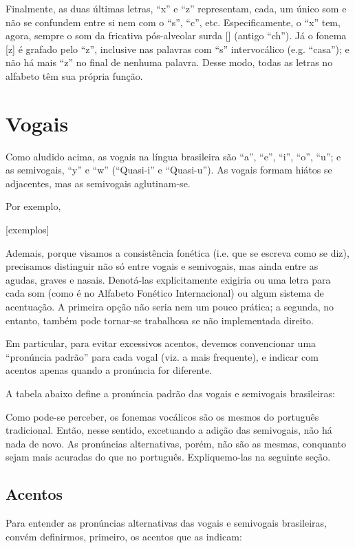 \documentclass[12pt, a5paper, titlepage]{article}
\begin{document}
\begin{bilingualpages}
    Finalmente, as duas últimas letras, ``x'' e ``z'' representam, cada, um único som e não se confundem entre si nem com o ``s'', ``c'', etc. Especificamente, o ``x'' tem, agora, sempre o som da fricativa pós-alveolar surda [\textesh] (antigo ``ch''). Já o fonema [z] é grafado pelo ``z'', inclusive nas palavras com ``s'' intervocálico (e.g. ``casa''); e não há mais ``z'' no final de nenhuma palavra. Desse modo, todas as letras no alfabeto têm sua própria função.

    \section{Vogais}
    Como aludido acima, as vogais na língua brasileira são ``a'', ``e'', ``i'', ``o'', ``u''; e as semivogais, ``y'' e ``w'' (``Quasi-i'' e ``Quasi-u''). As vogais formam hiátos se adjacentes, mas as semivogais aglutinam-se.
    
    Por exemplo,

    [exemplos]

    Ademais, porque visamos a consistência fonética (i.e. que se escreva como se diz), precisamos distinguir não só entre vogais e semivogais, mas ainda entre as agudas, graves e nasais. Denotá-las explicitamente exigiria ou uma letra para cada som (como é no Alfabeto Fonético Internacional) ou algum sistema de acentuação. A primeira opção não seria nem um pouco prática; a segunda, no entanto, também pode tornar-se trabalhosa se não implementada direito.
    
    Em particular, para evitar excessivos acentos, devemos convencionar uma ``pronúncia padrão'' para cada vogal (viz. a mais frequente), e indicar com acentos apenas quando a pronúncia for diferente.

    A tabela abaixo define a pronúncia padrão das vogais e semivogais brasileiras:

    \PtTableVowels

    Como pode-se perceber, os fonemas vocálicos são os mesmos do português tradicional. Então, nesse sentido, excetuando a adição das semivogais, não há nada de novo. As pronúncias alternativas, porém, não são as mesmas, conquanto sejam mais acuradas do que no português. Expliquemo-las na seguinte seção.

    \subsection{Acentos}
    Para entender as pronúncias alternativas das vogais e semivogais brasileiras, convém definirmos, primeiro, os acentos que as indicam:


\end{bilingualpages}
\end{document}
